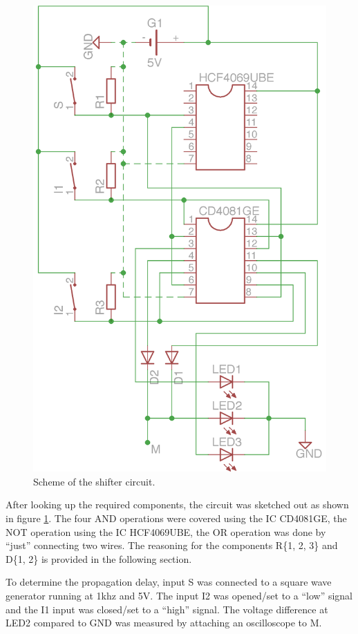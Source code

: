 \documentclass[journal]{IEEEtran}
\begin{document}
\begin{figure}[h!]
  \centering
   \includegraphics[]{boards/shifter.png}
   \caption{Scheme of the shifter circuit.}
   \label{fig:shifter}
\end{figure}

After looking up the required components, the circuit was sketched out as shown
in figure \ref{fig:shifter}. The four AND operations were covered using the IC
CD4081GE, the NOT operation using the IC HCF4069UBE, the OR operation was done
by ``just'' connecting two wires. The reasoning for the components R\{1, 2, 3\}
and D\{1, 2\} is provided in the following section.

To determine the propagation delay, input S was connected to a square
wave generator running at 1khz and 5V. The input I2 was opened/set to a ``low''
signal and the I1 input was closed/set to a ``high'' signal. The voltage
difference at LED2 compared to GND was measured by attaching an oscilloscope to
M.
\end{document}
